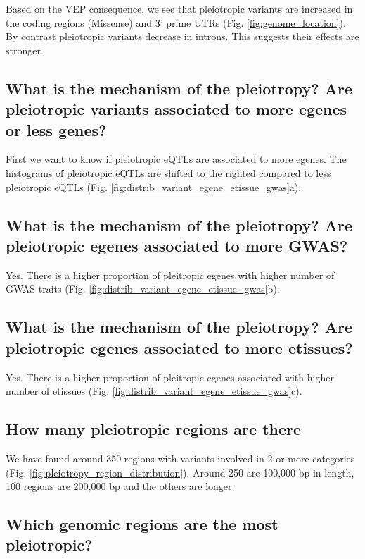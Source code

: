 Based on the VEP consequence, we see that pleiotropic variants are increased in the coding regions (Missense) and 3' prime UTRs (Fig. \ref{fig:genome_location}).
By contrast pleiotropic variants decrease in introns.
This suggests their effects are stronger.

\subsection*{What is the mechanism of the pleiotropy? Are pleiotropic variants associated to more egenes or less genes?}

First we want to know if pleiotropic eQTLs are associated to more egenes.
The histograms of pleiotropic eQTLs are shifted to the righted compared to less pleiotropic eQTLs (Fig. \ref{fig:distrib_variant_egene_etissue_gwas}a).

\subsection*{What is the mechanism of the pleiotropy? Are pleiotropic egenes associated to more GWAS?}

Yes. There is a higher proportion of pleitropic egenes with higher number of GWAS traits (Fig. \ref{fig:distrib_variant_egene_etissue_gwas}b).

\subsection*{What is the mechanism of the pleiotropy? Are pleiotropic egenes associated to more etissues?}

Yes. There is a higher proportion of pleitropic egenes associated with higher number of etissues (Fig. \ref{fig:distrib_variant_egene_etissue_gwas}c).

\subsection*{How many pleiotropic regions are there}

We have found around 350 regions with variants involved in 2 or more categories (Fig. \ref{fig:pleiotropy_region_distribution}).
Around 250 are 100,000 bp in length, 100 regions are 200,000 bp and the others are longer.

\subsection*{Which genomic regions are the most pleiotropic?}

